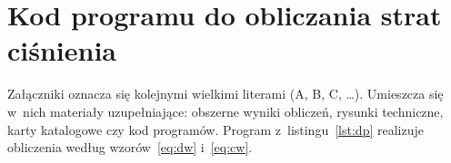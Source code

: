 \chapter{Kod programu do obliczania strat ciśnienia}
\label{zal:kod}

Załączniki oznacza się kolejnymi wielkimi literami (A, B, C, \dots).
Umieszcza się w~nich materiały uzupełniające: obszerne wyniki obliczeń,
rysunki techniczne, karty katalogowe czy kod programów. Program
z~listingu~\ref{lst:dp} realizuje obliczenia według
wzorów~\eqref{eq:dw} i~\eqref{eq:cw}.


